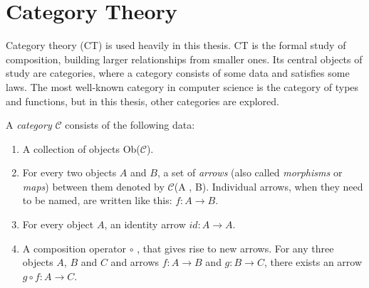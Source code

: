 \section{Category Theory}
Category theory (CT) is used heavily in this thesis. CT is the formal study of composition, building larger relationships from smaller ones. Its central objects of study are categories, where a category consists of some data and satisfies some laws. The most well-known category in computer science is the category of types and functions, but in this thesis, other categories are explored. 




A \textit{category} $\mathcal{C}$ consists of the following data:

\begin{enumerate}
  \item A collection of objects Ob($\mathcal{C}$).
  \item For every two objects $A$ and $B$, a set of \textit{arrows} (also called \textit{morphisms} or \textit{maps}) between them denoted by $\mathcal{C}$(A , B). Individual arrows, when they need to be named, are written like this: $f : A \rightarrow B $.
  \item For every object $A$, an identity arrow $id : A \rightarrow A$. 
  \item A composition operator $ \circ $ , that gives rise to new arrows. For any three objects $A$, $B$ and $C$ and arrows $f : A \rightarrow B $ and $g : B \rightarrow C $, there exists an arrow $g \circ f : A \rightarrow C $.
\end{enumerate}

